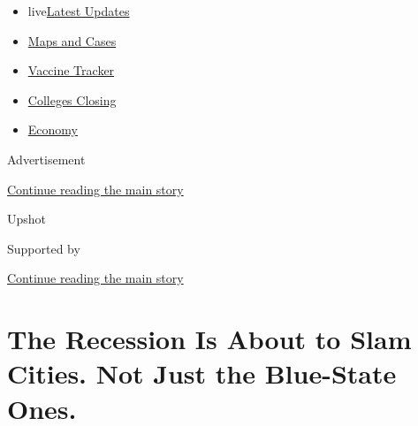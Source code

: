 \begin{itemize}
\tightlist
\item
  live\href{https://www.nytimes3xbfgragh.onion/2020/08/20/world/coronavirus-covid.html?name=styln-coronavirus-national\&region=TOP_BANNER\&variant=undefined\&block=storyline_menu_recirc\&action=click\&pgtype=Article\&impression_id=868e7b81-e38d-11ea-85e7-9f87a3618d91}{Latest
  Updates}
\item
  \href{https://www.nytimes3xbfgragh.onion/interactive/2020/us/coronavirus-us-cases.html?name=styln-coronavirus-national\&region=TOP_BANNER\&variant=undefined\&block=storyline_menu_recirc\&action=click\&pgtype=Article\&impression_id=868ea290-e38d-11ea-85e7-9f87a3618d91}{Maps
  and Cases}
\item
  \href{https://www.nytimes3xbfgragh.onion/interactive/2020/science/coronavirus-vaccine-tracker.html?name=styln-coronavirus-national\&region=TOP_BANNER\&variant=undefined\&block=storyline_menu_recirc\&action=click\&pgtype=Article\&impression_id=868ea291-e38d-11ea-85e7-9f87a3618d91}{Vaccine
  Tracker}
\item
  \href{https://www.nytimes3xbfgragh.onion/2020/08/19/us/colleges-closing-covid.html?name=styln-coronavirus-national\&region=TOP_BANNER\&variant=undefined\&block=storyline_menu_recirc\&action=click\&pgtype=Article\&impression_id=868ea292-e38d-11ea-85e7-9f87a3618d91}{Colleges
  Closing}
\item
  \href{https://www.nytimes3xbfgragh.onion/live/2020/08/20/business/stock-market-today-coronavirus?name=styln-coronavirus-national\&region=TOP_BANNER\&variant=undefined\&block=storyline_menu_recirc\&action=click\&pgtype=Article\&impression_id=868ea293-e38d-11ea-85e7-9f87a3618d91}{Economy}
\end{itemize}

Advertisement

\protect\hyperlink{after-top}{Continue reading the main story}

Upshot

Supported by

\protect\hyperlink{after-sponsor}{Continue reading the main story}

\hypertarget{the-recession-is-about-to-slam-cities-not-just-the-blue-state-ones}{%
\section{The Recession Is About to Slam Cities. Not Just the Blue-State
Ones.}\label{the-recession-is-about-to-slam-cities-not-just-the-blue-state-ones}}

